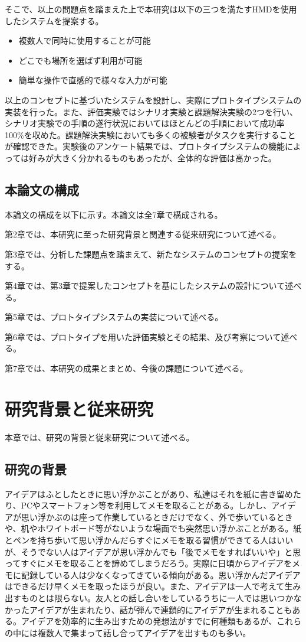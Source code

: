 \documentclass[11pt,a4j, titlepage]{jarticle} %
\begin{document}
そこで、以上の問題点を踏まえた上で本研究は以下の三つを満たすHMDを使用したシステムを提案する。
\begin{itemize}
 \item 複数人で同時に使用することが可能
 \item どこでも場所を選ばず利用が可能
 \item 簡単な操作で直感的で様々な入力が可能
\end{itemize}

以上のコンセプトに基づいたシステムを設計し、実際にプロトタイプシステムの実装を行った。また、評価実験ではシナリオ実験と課題解決実験の2つを行い、シナリオ実験での手順の遂行状況においてはほとんどの手順において成功率100\%を収めた。課題解決実験においても多くの被験者がタスクを実行することが確認できた。実験後のアンケート結果では、プロトタイプシステムの機能によっては好みが大きく分かれるものもあったが、全体的な評価は高かった。

\subsection{本論文の構成}
本論文の構成を以下に示す。本論文は全7章で構成される。

第2章では、本研究に至った研究背景と関連する従来研究について述べる。

第3章では、分析した課題点を踏まえて、新たなシステムのコンセプトの提案をする。

第4章では、第3章で提案したコンセプトを基にしたシステムの設計について述べる。

第5章では、プロトタイプシステムの実装について述べる。

第6章では、プロトタイプを用いた評価実験とその結果、及び考察について述べる。

第7章では、本研究の成果とまとめ、今後の課題について述べる。

\newpage
\section{研究背景と従来研究}
本章では、研究の背景と従来研究について述べる。

\subsection{研究の背景}
アイデアはふとしたときに思い浮かぶことがあり、私達はそれを紙に書き留めたり、PCやスマートフォン等を利用してメモを取ることがある。しかし、アイデアが思い浮かぶのは座って作業しているときだけでなく、外で歩いているときや、机やホワイトボード等がないような場面でも突然思い浮かぶことがある。紙とペンを持ち歩いて思い浮かんだらすぐにメモを取る習慣ができてる人はいいが、そうでない人はアイデアが思い浮かんでも「後でメモをすればいいや」と思ってすぐにメモを取ることを諦めてしまうだろう。実際に日頃からアイデアをメモに記録している人は少なくなってきている傾向がある\cite{memo}。思い浮かんだアイデアはできるだけ早くメモを取ったほうが良い。また、アイデアは一人で考えて生み出すものとは限らない。友人との話し合いをしているうちに一人では思いつかなかったアイデアが生まれたり、話が弾んで連鎖的にアイデアが生まれることもある。アイデアを効率的に生み出すための発想法がすでに何種類もあるが、これらの中には複数人で集まって話し合ってアイデアを出すものも多い\cite{hassouhou}。
\end{document}
